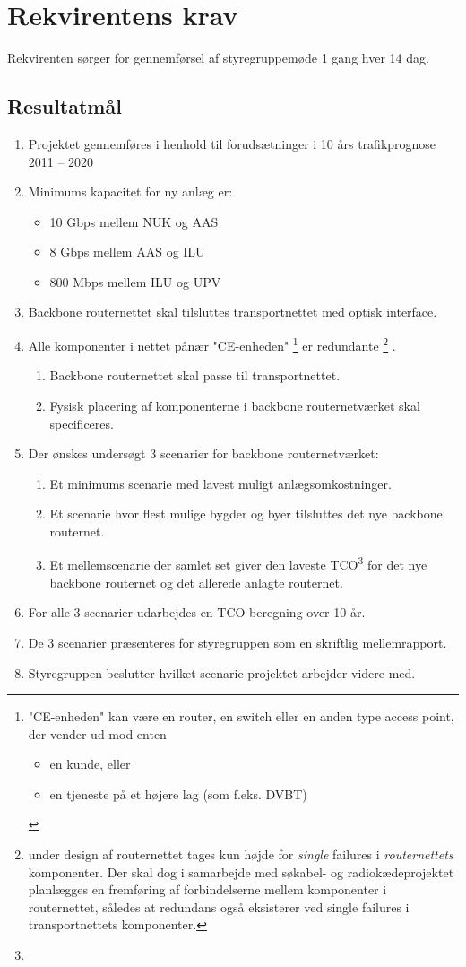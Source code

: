\documentclass[11pt,a4paper]{article}
\begin{document}
\section{Rekvirentens krav}
 Rekvirenten sørger for gennemførsel af styregruppemøde 1 gang hver 14 dag.
\subsection{Resultatmål}
\begin{enumerate}
\item Projektet gennemføres i henhold til forudsætninger i 10 års trafikprognose 2011 – 2020
\item Minimums kapacitet for ny anlæg er:
\begin{itemize}
\item 10 Gbps mellem NUK og AAS
\item 8 Gbps mellem AAS og ILU
\item 800 Mbps mellem ILU og UPV
\end{itemize}
\item Backbone routernettet skal tilsluttes transportnettet med optisk interface.
\item Alle komponenter i nettet pånær "CE-enheden"
\footnote{
"CE-enheden" kan være en router, en switch eller en anden type access point, der vender ud mod enten
\begin{itemize}
\item en kunde, eller
\item en tjeneste på et højere lag (som f.eks. DVBT)
\end{itemize}
}
er redundante
\footnote{
under design af routernettet tages kun højde for {\em single} failures i {\em routernettets} komponenter. Der skal dog i samarbejde med søkabel- og radiokædeprojektet planlægges en fremføring af forbindelserne mellem komponenter i routernettet, således at redundans også eksisterer ved single failures i transportnettets komponenter.
}
.
\begin{enumerate}
\item Backbone routernettet skal passe til transportnettet.
\item Fysisk placering af komponenterne i backbone routernetværket skal specificeres.
\end{enumerate}
\item Der ønskes undersøgt 3 scenarier for backbone routernetværket:
\begin{enumerate}
\item Et minimums scenarie med lavest muligt anlægsomkostninger.
\item Et scenarie hvor flest mulige bygder og byer tilsluttes det nye backbone routernet.
\item Et mellemscenarie der samlet set giver den laveste TCO\footnote{
}
for det nye backbone routernet og det allerede anlagte routernet.
\end{enumerate}
\item For alle 3 scenarier udarbejdes en TCO beregning over 10 år.
\item De 3 scenarier præsenteres for styregruppen som en skriftlig mellemrapport.
\item Styregruppen beslutter hvilket scenarie projektet arbejder videre med.
\end{enumerate}
\end{document}
